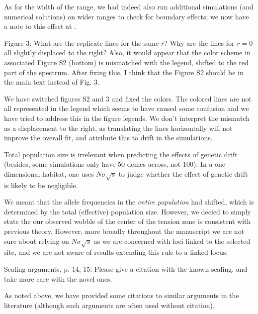As for the width of the range, we had indeed also run additional simulations (and numerical solutions) on wider ranges to check for boundary effects;
we now have a note to this effect at .

\begin{point}{Figure 3:}
What are the replicate lines for the same $r$? Why are the lines for $r = 0$ all slightly displaced to the right? Also, it would appear that the color scheme in associated Figure S2 (bottom) is mismatched with the legend, shifted to the red part of the spectrum. After fixing this, I think that the Figure S2 should be in the main text instead of Fig. 3.
\end{point}

\reply
We have switched figures S2 and 3 and fixed the colors. The colored lines are not all represented in the legend which seems to have caused some confusion and we have tried to address this in the figure legends. We don't interpret the mismatch as a displacement to the right, as translating the lines horizontally will not improve the overall fit, and attribute this to drift in the simulations.

\begin{point}{\revref}
Total population size is irrelevant when predicting the effects of genetic drift (besides, some simulations only have 50 demes across, not 100). In a one-dimensional habitat, one uses $N \sigma \sqrt{s}$ to judge whether the effect of genetic drift is likely to be negligible.
\end{point}

\reply
We meant that the allele frequencies in the \emph{entire population} had shifted, which is determined by the total (effective) population size.  
However, we decied to 
simply state the our observed wobble of the center of the tension zone is consistent with previous theory. However, more broadly throughout the manuscript we are not sure about relying on $N \sigma \sqrt{s}$ as we are concerned with loci linked to the selected site, and we are not aware of results extending this rule to a linked locus.

\begin{point}{Scaling arguments, p. 14, 15:}
 Please give a citation with the known scaling, and take more care with the novel ones.  
\end{point}

\reply
As noted above, we have provided some citations to similar arguments in the literature
(although such arguments are often used without citation).

